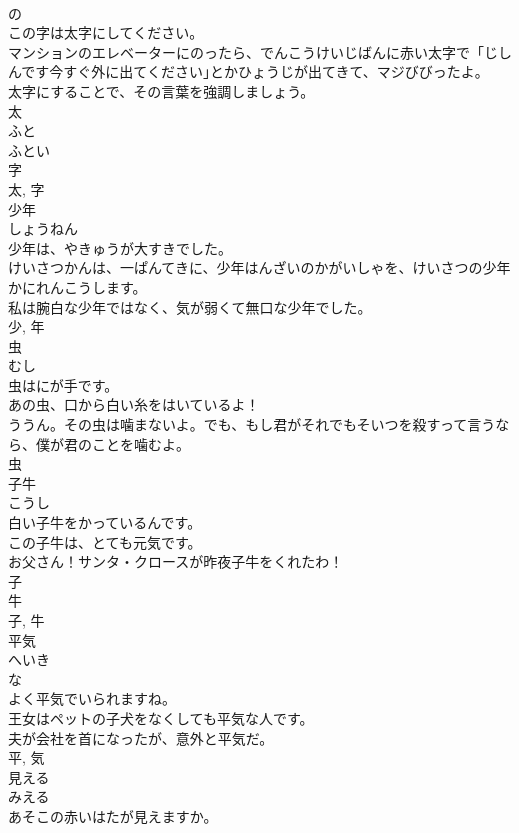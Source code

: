 \documentclass[8pt]{extreport}
\begin{document}
\begin{CJK}{UTF8}{min}
\\	の 
\\	この字は太字にしてください。	
\\	マンションのエレベーターにのったら、でんこうけいじばんに赤い太字で「じしんです今すぐ外に出てください｣とかひょうじが出てきて、マジびびったよ。	
\\	太字にすることで、その言葉を強調しましょう。	
\\	太 
\\	ふと 
\\	ふとい 
\\	字 
\\	太, 字	
\\	少年	
\\	しょうねん	
\\	少年は、やきゅうが大すきでした。	
\\	けいさつかんは、一ぱんてきに、少年はんざいのかがいしゃを、けいさつの少年かにれんこうします。	
\\	私は腕白な少年ではなく、気が弱くて無口な少年でした。	
\\	少, 年	
\\	虫	
\\	むし	
\\	虫はにが手です。	
\\	あの虫、口から白い糸をはいているよ！	
\\	ううん。その虫は噛まないよ。でも、もし君がそれでもそいつを殺すって言うなら、僕が君のことを噛むよ。	
\\	虫	
\\	子牛	
\\	こうし	
\\	白い子牛をかっているんです。	
\\	この子牛は、とても元気です。	
\\	お父さん！サンタ・クロースが昨夜子牛をくれたわ！	
\\	子 
\\	牛 
\\	子, 牛	
\\	平気	
\\	へいき	
\\	な 
\\	よく平気でいられますね。	
\\	王女はペットの子犬をなくしても平気な人です。	
\\	夫が会社を首になったが、意外と平気だ。	
\\	平, 気	
\\	見える	
\\	みえる	
\\	あそこの赤いはたが見えますか。	

\end{CJK}
\end{document}
